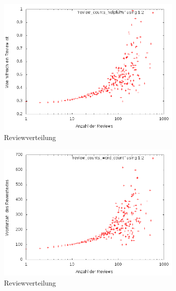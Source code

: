 \documentclass{beamer}
\begin{document}
		\begin{frame}
	\begin{figure}[H]
\centering
    \includegraphics[width=0.8\textwidth]{_results/helpfull_count2.png}
    \caption{Reviewverteilung}
\end{figure}
	\end{frame}
	
		\begin{frame}
	\begin{figure}[H]
\centering
    \includegraphics[width=0.8\textwidth]{_results/word_count2.png}
    \caption{Reviewverteilung}
\end{figure}
	\end{frame}
	
\end{document}
